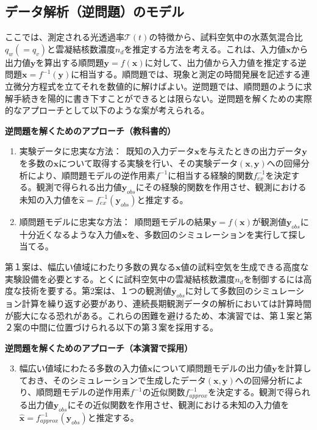 \documentclass{ltjsarticle}
\begin{document}
\subsection{データ解析（逆問題）のモデル}
ここでは、測定される光透過率$\mathcal{T}(t)$の特徴から、試料空気中の水蒸気混合比$q_{w}(=q_{v})$と雲凝結核数濃度$n_{d}$を推定する方法を考える。これは、入力値$\bm{x}$から出力値$\bm{y}$を算出する順問題$\bm{y}=f(\bm{x})$に対して、出力値から入力値を推定する逆問題$\bm{x}=f^{-1}(\bm{y})$に相当する。順問題では、現象と測定の時間発展を記述する連立微分方程式を立てそれを数値的に解けばよい。逆問題では、順問題のように求解手続きを陽的に書き下すことができるとは限らない。逆問題を解くための実際的なアプローチとして以下のような案が考えられる。\\
\begin{itembox}[l]{\bf{逆問題を解くためのアプローチ（教科書的）}}
\begin{enumerate}
\item 実験データに忠実な方法：\, 既知の入力データ$\bm{x}$を与えたときの出力データ$\bm{y}$を多数の$\bm{x}$について取得する実験を行い、その実験データ$(\bm{x}, \bm{y})$への回帰分析により、順問題モデルの逆作用素$f^{-1}$に相当する経験的関数$f^{-1}_{ex}$を決定する。観測で得られる出力値$\bm{y}_{obs}$にその経験的関数を作用させ、観測における未知の入力値を$\bm{\hat{x}}=f^{-1}_{ex}(\bm{y}_{obs})$と推定する。
\item 順問題モデルに忠実な方法：\, 順問題モデルの結果$\bm{y}=f(\bm{x})$が観測値$\bm{y}_{obs}$に十分近くなるような入力値$\bm{x}$を、多数回のシミュレーションを実行して探し当てる。
\end{enumerate}
\end{itembox}

第１案は、幅広い値域にわたり多数の異なる$\bm{x}$値の試料空気を生成できる高度な実験設備を必要とする。とくに試料空気中の雲凝結核数濃度$n_{d}$を制御するには高度な技術を要する。第2案は、１つの観測値$\bm{y}_{obs}$に対して多数回のシミュレーション計算を繰り返す必要があり、連続長期観測データの解析においては計算時間が膨大になる恐れがある。これらの困難を避けるため、本演習では、第１案と第２案の中間に位置づけられる以下の第３案を採用する。\\

\begin{itembox}[l]{\bf{逆問題を解くためのアプローチ（本演習で採用）}}
\begin{enumerate}
\setcounter{enumi}{2}
\item 幅広い値域にわたる多数の入力値$\bm{x}$について順問題モデルの出力値$\bm{y}$を計算しておき、そのシミュレーションで生成したデータ$(\bm{x}, \bm{y})$への回帰分析により、順問題モデルの逆作用素$f^{-1}$の近似関数$f^{-1}_{approx}$を決定する。観測で得られる出力値$\bm{y}_{obs}$にその近似関数を作用させ、観測における未知の入力値を$\bm{\hat{x}}=f^{-1}_{approx}(\bm{y}_{obs})$と推定する。
\end{enumerate}
\end{itembox}
\end{document}

